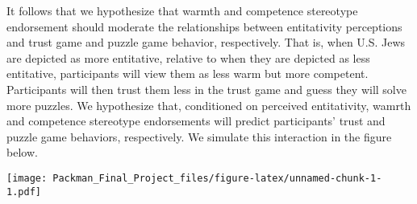 \documentclass[
  doc,draftall]{apa6}
\begin{document}
It follows that we hypothesize that warmth and competence stereotype endorsement should moderate the relationships between entitativity perceptions and trust game and puzzle game behavior, respectively. That is, when U.S. Jews are depicted as more entitative, relative to when they are depicted as less entitative, participants will view them as less warm but more competent. Participants will then trust them less in the trust game and guess they will solve more puzzles. We hypothesize that, conditioned on perceived entitativity, wamrth and competence stereotype endorsements will predict participants' trust and puzzle game behaviors, respectively. We simulate this interaction in the figure below.

\texttt{[image: Packman\_Final\_Project\_files/figure-latex/unnamed-chunk-1-1.pdf]}
\end{document}
